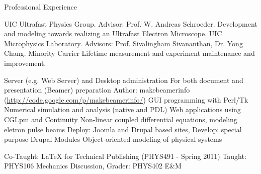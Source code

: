 \begin{rubric}{Professional Experience}


  \entry*[2005 --- \ldots] UIC Ultrafast Physics Group. Advisor: Prof. W. Andreas Schroeder. Development and modeling towards realizing an Ultrafast Electron Microscope.
  \entry*[2003 --- 2005] UIC Microphysics Laboratory. Advisors: Prof. Sivalingham Sivananthan, Dr. Yong Chang. Minority Carrier Lifetime measurement and experiment maintenance and improvement.


  \entry*[Linux] Server (e.g. Web Server) and Desktop administration
  \entry*[\LaTeX] For both document and presentation (Beamer) preparation
  \entry*[Perl] Author: makebeamerinfo (\url{http://code.google.com/p/makebeamerinfo/})
  \entry*[Perl] GUI programming with Perl/Tk
  \entry*[Perl] Numerical simulation and analysis (native and PDL)
  \entry*[Perl] Web applications using CGI.pm and Continuity
  \entry*[Mathematica] Non-linear coupled differential equations, modeling eletron pulse beams
  \entry*[PHP] Deploy: Joomla and Drupal based sites, Develop: special purpose Drupal Modules
  \entry*[Modelica] Object oriented modeling of physical systems
  

  \entry*[Teaching] Co-Taught: \LaTeX{} for Technical Publishing (PHYS491 - Spring 2011)
  \entry*[T.A.] Taught: PHYS106 Mechanics Discussion, Grader: PHYS402 E\&M

\end{rubric}
